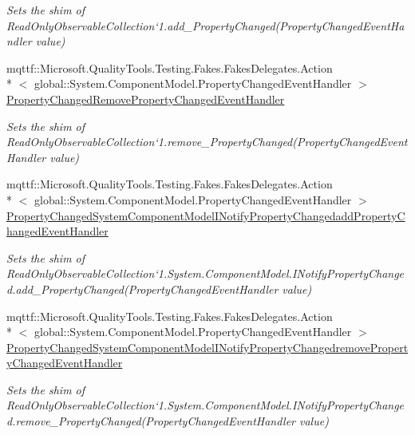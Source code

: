 \begin{DoxyCompactItemize}
\begin{DoxyCompactList}\small\item\em Sets the shim of Read\-Only\-Observable\-Collection`1.add\-\_\-\-Property\-Changed(\-Property\-Changed\-Event\-Handler value)\end{DoxyCompactList}\item 
mqttf\-::\-Microsoft.\-Quality\-Tools.\-Testing.\-Fakes.\-Fakes\-Delegates.\-Action\\*
$<$ global\-::\-System.\-Component\-Model.\-Property\-Changed\-Event\-Handler $>$ \hyperlink{class_system_1_1_collections_1_1_object_model_1_1_fakes_1_1_shim_read_only_observable_collection_3_01_t_01_4_a3f049258ec3bd478838ff82f8dd930a1}{Property\-Changed\-Remove\-Property\-Changed\-Event\-Handler}
\begin{DoxyCompactList}\small\item\em Sets the shim of Read\-Only\-Observable\-Collection`1.remove\-\_\-\-Property\-Changed(\-Property\-Changed\-Event\-Handler value)\end{DoxyCompactList}\item 
mqttf\-::\-Microsoft.\-Quality\-Tools.\-Testing.\-Fakes.\-Fakes\-Delegates.\-Action\\*
$<$ global\-::\-System.\-Component\-Model.\-Property\-Changed\-Event\-Handler $>$ \hyperlink{class_system_1_1_collections_1_1_object_model_1_1_fakes_1_1_shim_read_only_observable_collection_3_01_t_01_4_ad77c88bab10cbae0f7054c055fc761aa}{Property\-Changed\-System\-Component\-Model\-I\-Notify\-Property\-Changedadd\-Property\-Changed\-Event\-Handler}
\begin{DoxyCompactList}\small\item\em Sets the shim of Read\-Only\-Observable\-Collection`1.System.\-Component\-Model.\-I\-Notify\-Property\-Changed.\-add\-\_\-\-Property\-Changed(\-Property\-Changed\-Event\-Handler value)\end{DoxyCompactList}\item 
mqttf\-::\-Microsoft.\-Quality\-Tools.\-Testing.\-Fakes.\-Fakes\-Delegates.\-Action\\*
$<$ global\-::\-System.\-Component\-Model.\-Property\-Changed\-Event\-Handler $>$ \hyperlink{class_system_1_1_collections_1_1_object_model_1_1_fakes_1_1_shim_read_only_observable_collection_3_01_t_01_4_a77fbcee8d956c664f26c71e84ff146b8}{Property\-Changed\-System\-Component\-Model\-I\-Notify\-Property\-Changedremove\-Property\-Changed\-Event\-Handler}
\begin{DoxyCompactList}\small\item\em Sets the shim of Read\-Only\-Observable\-Collection`1.System.\-Component\-Model.\-I\-Notify\-Property\-Changed.\-remove\-\_\-\-Property\-Changed(\-Property\-Changed\-Event\-Handler value)\end{DoxyCompactList}\end{DoxyCompactItemize}


